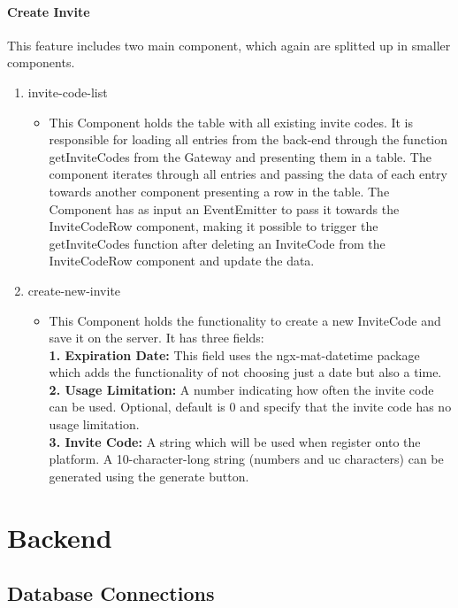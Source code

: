 \paragraph{Create Invite}
This feature includes two main component, which again are splitted up in smaller components.

\begin{enumerate}
\item invite-code-list
	\begin{itemize}
		\item This Component holds the table with all existing invite codes. It is responsible for loading all entries from the back-end through the function getInviteCodes from the Gateway and presenting them in a table. The component iterates through all entries and passing the data of each entry towards another component presenting a row in the table. The Component has as input an EventEmitter to pass it towards the InviteCodeRow component, making it possible to trigger the getInviteCodes function after deleting an InviteCode from the InviteCodeRow component and update the data.
	\end{itemize}
\item create-new-invite
	\begin{itemize}
		\item This Component holds the functionality to create a new InviteCode and save it on the server. It has three fields: \\  
		\textbf{1.	Expiration Date:} This field uses the ngx-mat-datetime package which adds the functionality of not choosing just a date but also a time. \\
		\textbf{2.	Usage Limitation:} A number indicating how often the invite code can be used. Optional, default is 0 and specify that the invite code has no usage limitation. \\
		\textbf{3.	Invite Code:} A string which will be used when register onto the platform. A 10-character-long string (numbers and uc characters) can be generated using the generate button.\\	
	\end{itemize}	
\end{enumerate}

\section{Backend}

\subsection{Database Connections}

